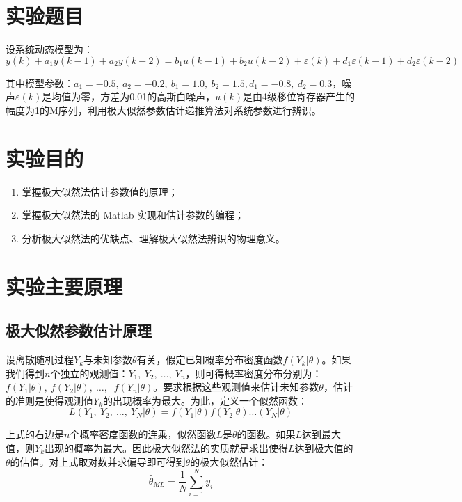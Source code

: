 \documentclass[UTF8]{article}
\begin{document}
\section{实验题目}
设系统动态模型为：
\begin{equation*}
    y(k) + a_1y(k-1) + a_2y(k-2) = b_1u(k-1) + b_2u(k-2) + \varepsilon(k) + d_1\varepsilon(k-1) + d_2\varepsilon(k-2)
\end{equation*}

其中模型参数：$a_1 = -0.5,\ a_2 = -0.2,\ b_1 = 1.0,\ b_2 = 1.5, d_1 = -0.8,\ d_2 = 0.3$，噪声$\varepsilon(k)$是均值为零，方差为0.01的高斯白噪声，$u(k)$是由4级移位寄存器产生的幅度为1的M序列，利用极大似然参数估计递推算法对系统参数进行辨识。


%
\section{实验目的}
\begin{enumerate}
    \item 掌握极大似然法估计参数值的原理；
    \item 掌握极大似然法的 Matlab 实现和估计参数的编程；
    \item 分析极大似然法的优缺点、理解极大似然法辨识的物理意义。
\end{enumerate}


%
\section{实验主要原理}
\subsection{极大似然参数估计原理}
设离散随机过程${Y_k}$与未知参数$\theta$有关，假定已知概率分布密度函数$f(Y_k|\theta)$。如果我们得到$n$个独立的观测值：$Y_1,\ Y_2,\ …,\ Y_n$，则可得概率密度分布分别为：$f(Y_1|\theta),\ f(Y_2|\theta),\ …,$ $\ f(Y_n|\theta)$。要求根据这些观测值来估计未知参数$\theta$，估计的准则是使得观测值${Y_k}$的出现概率为最大。为此，定义一个似然函数：
\begin{equation*}
    L(Y_1,\ Y_2,\ \dots,\ Y_N|\theta) = f(Y_1|\theta)f(Y_2|\theta)\dots(Y_N|\theta)
\end{equation*}

上式的右边是$n$个概率密度函数的连乘，似然函数$L$是$\theta$的函数。如果$L$达到最大值，则${Y_k}$出现的概率为最大。因此极大似然法的实质就是求出使得$L$达到极大值的$\theta$的估值。对上式取对数并求偏导即可得到$\theta$的极大似然估计：
\begin{equation*}
    \hat{\theta}_{ML} = \frac{1}{N}\sum_{i=1}^Ny_i
\end{equation*}
\end{document}
